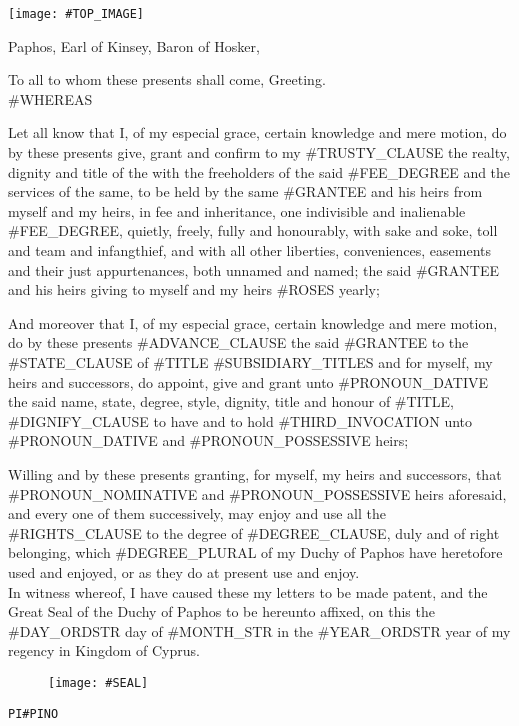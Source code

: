 \documentclass[varwidth=true,border=50pt]{standalone}
\begin{document}
\thispagestyle{fancy}

\noindent \texttt{[image: \#TOP\_IMAGE]}

{\LARGE
    Paphos, Earl of Kinsey, Baron of Hosker,

    \hspace{20pt} To all to whom these presents shall come, Greeting.\\

    #WHEREAS

    Let all know that I, of my especial grace, certain knowledge and mere motion, do by these presents give, grant and confirm to my #TRUSTY_CLAUSE \hspace{7pt}{\hoskeroe #GRANTEE}\hspace{7pt} the realty, dignity and title of the \hspace{7pt}{\hoskeroe #FEE_TITLE}\hspace{7pt} with the freeholders of the said #FEE_DEGREE and the services of the same, to be held by the same #GRANTEE and his heirs from myself and my heirs, in fee and inheritance, one indivisible and inalienable #FEE_DEGREE, quietly, freely, fully and honourably, with sake and soke, toll and team and infangthief, and with all other liberties, conveniences, easements and their just appurtenances, both unnamed and named; the said #GRANTEE and his heirs giving to myself and my heirs #ROSES yearly;

    \hspace{20pt} And moreover that I, of my especial grace, certain knowledge and mere motion, do by these presents #ADVANCE_CLAUSE the said #GRANTEE to the #STATE_CLAUSE of #TITLE #SUBSIDIARY_TITLES and for myself, my heirs and successors, do appoint, give and grant unto #PRONOUN_DATIVE the said name, state, degree, style, dignity, title and honour of #TITLE, #DIGNIFY_CLAUSE to have and to hold #THIRD_INVOCATION unto #PRONOUN_DATIVE and #PRONOUN_POSSESSIVE heirs;

    \hspace{20pt} Willing and by these presents granting, for myself, my heirs and successors, that #PRONOUN_NOMINATIVE and #PRONOUN_POSSESSIVE heirs aforesaid, and every one of them successively, may enjoy and use all the #RIGHTS_CLAUSE to the degree of #DEGREE_CLAUSE, duly and of right belonging, which #DEGREE_PLURAL of my Duchy of Paphos have heretofore used and enjoyed, or as they do at present use and enjoy.\\

    \hspace{20pt} In witness whereof, I have caused these my letters to be made patent, and the Great Seal of the Duchy of Paphos to be hereunto affixed, on this the #DAY_ORDSTR day of #MONTH_STR in the #YEAR_ORDSTR year of my regency in Kingdom of Cyprus.
}

\begin{figure}[h]
    \centering
    \texttt{[image: \#SEAL]}
\end{figure}

\hfill {\footnotesize \texttt{PI{#PINO}}}
\end{document}
